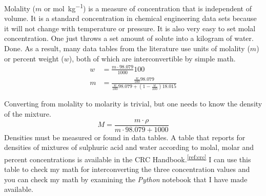 \documentclass[]{tufte-handout}
\newcommand{\tss}[1]{\textsuperscript{#1}}
\begin{document}
Molality ($m$ or \unit{\mole\per\kilo\gram}) is a measure of concentration that is independent of volume. It is a standard concentration in chemical engineering data sets because it will not change with temperature or pressure. It is also very easy to set molal concentration. One just throws a set amount of solute into a kilogram of water. Done. As a result, many data tables from the literature use units of molality ($m$) or percent weight ($w$), both of which are interconvertible by simple math.
\begin{align}
w &= \frac{m \cdot 98.079}{1000}100 \\
m &= \frac{\frac{w}{100}98.079}{\frac{w}{100}98.079 + \left(1-\frac{w}{100}\right)18.015}
\end{align}


Converting from molality to molarity is trivial, but one needs to know the density of the mixture.
\begin{equation}
M =  \frac{m\cdot \rho}{m \cdot 98.079 + 1000}
\end{equation}
Densities must be measured or found in data tables. A table that reports for densities of mixtures of sulphuric acid and water according to molal, molar and percent concentrations is available in the CRC Handbook.\tss{\ref{ref:crc}} I can use this table to check my math for interconverting the three concentration values and you can check my math by examining the \textit{Python} notebook that I have made available.
\end{document}
